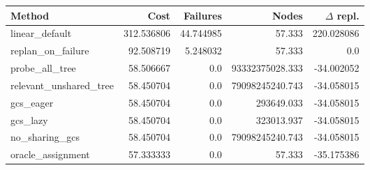 \begin{tabular}{lrrrr}
\toprule
Method & Cost & Failures & Nodes & $\Delta$ repl. \\
\midrule
linear\_default & 312.536806 & 44.744985 & 57.333 & 220.028086 \\
replan\_on\_failure & 92.508719 & 5.248032 & 57.333 & 0.0 \\
probe\_all\_tree & 58.506667 & 0.0 & 93332375028.333 & -34.002052 \\
relevant\_unshared\_tree & 58.450704 & 0.0 & 79098245240.743 & -34.058015 \\
gcs\_eager & 58.450704 & 0.0 & 293649.033 & -34.058015 \\
gcs\_lazy & 58.450704 & 0.0 & 323013.937 & -34.058015 \\
no\_sharing\_gcs & 58.450704 & 0.0 & 79098245240.743 & -34.058015 \\
oracle\_assignment & 57.333333 & 0.0 & 57.333 & -35.175386 \\
\bottomrule
\end{tabular}

